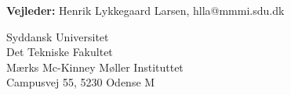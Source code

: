 \begin{titlepage}
\begin{center}
\vspace{7mm}

\textbf{Vejleder:} Henrik Lykkegaard Larsen, hlla@mmmi.sdu.dk \\

\vfill

Syddansk Universitet\\
Det Tekniske Fakultet\\
Mærks Mc-Kinney Møller Instituttet\\
Campusvej 55, 5230 Odense M

\end{center}
\end{titlepage}